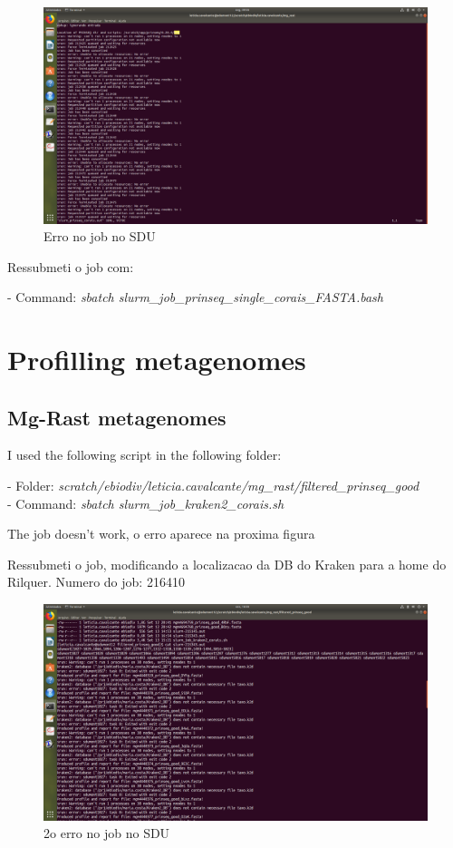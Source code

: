 \documentclass[12pt, a4paper]{report}
\begin{document}
 \begin{figure}
  \centering 
  \includegraphics[width=1.0\textwidth]{figures/Captura-2018-09-10 09-35-27.png}
  \caption{Erro no job no SDU}
 \end{figure}

Ressubmeti o job com:

\begin{tcolorbox}[width=6.3in]
- Command: \textit{sbatch slurm\_job\_prinseq\_single\_corais\_FASTA.bash}
\end{tcolorbox}


\chapter{Profilling metagenomes}
\section{Mg-Rast metagenomes}
I used the following script in the following folder:

\begin{tcolorbox}[width=6.3in]
- Folder: \textit{scratch/ebiodiv/leticia.cavalcante/mg\_rast/filtered\_prinseq\_good}\\
- Command: \textit{sbatch slurm\_job\_kraken2\_corais.sh}
\end{tcolorbox}

The job doesn't work, o erro aparece na proxima figura

Ressubmeti o job, modificando a localizacao da DB do Kraken para a home do Rilquer. Numero do job: 216410
 \begin{figure}
  \centering 
  \includegraphics[width=1.0\textwidth]{figures/Captura2.png}
  \caption{2o erro no job no SDU}
 \end{figure} 
\end{document}

